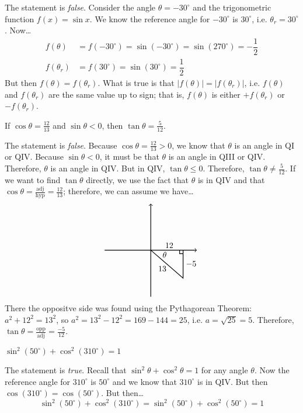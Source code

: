 \documentclass[11pt,letterpaper]{article}
\begin{document}
\sol The statement is \textit{false}. Consider the angle $\theta= -30^\circ$ and the trigonometric function $f(x)= \sin x$. We know the reference angle for $-30^\circ$ is $30^\circ$, i.e. $\theta_r= 30^\circ$. Now\dots
	\[
	\begin{aligned}
	f(\theta)&= f(-30^\circ)= \sin(-30^\circ)= \sin(270^\circ)= -\dfrac{1}{2} \\
	f(\theta_r)&= f(30^\circ)= \sin(30^\circ)= \dfrac{1}{2}
	\end{aligned}
	\]
But then $f(\theta)= f(\theta_r)$. What is true is that $|f(\theta)|= |f(\theta_r)|$, i.e. $f(\theta)$ and $f(\theta_r)$ are the same value up to sign; that is, $f(\theta)$ is either $+f(\theta_r)$ or $-f(\theta_r)$. \pvspace{1.3cm}



 If $\cos \theta= \frac{12}{13}$ and $\sin \theta < 0$, then $\tan \theta= \frac{5}{12}$. \pspace

\sol The statement is \textit{false}. Because $\cos \theta= \frac{12}{13} > 0$, we know that $\theta$ is an angle in QI or QIV. Because $\sin \theta < 0$, it must be that $\theta$ is an angle in QIII or QIV. Therefore, $\theta$ is an angle in QIV. But in QIV, $\tan \theta \leq 0$. Therefore, $\tan \theta \neq \frac{5}{12}$. If we want to find $\tan \theta$ directly, we use the fact that $\theta$ is in QIV and that $\cos \theta= \frac{\text{adj}}{\text{hyp}}= \frac{12}{13}$; therefore, we can assume we have\dots
	\[
	\begin{tikzpicture}
	\draw[line width=0.03cm,->] (-2,0) -- (2,0);				%
	\draw[line width=0.03cm,->] (0,-2) -- (0,2);				%
	
	\node at (0.6,-0.2) {$\theta$};
	\draw[line width=0.03cm] (0,0) -- (1.4,-1.2) -- (1.4,0);			%
	\draw[line width=0.03cm] (1.25,0) -- (1.25,-0.15) -- (1.4,-0.15);	%
	
	\node at (0.8,0.2) {$12$};
	\node at (1.75,-0.6) {$-5$};
	\node at (0.5,-0.8) {$13$};
	\end{tikzpicture}
	\]
There the oppositve side was found using the Pythagorean Theorem: $a^2 + 12^2= 13^2$, so $a^2= 13^2 - 12^2= 169 - 144= 25$, i.e. $a= \sqrt{25}= 5$. Therefore, $\tan \theta= \frac{\text{opp}}{\text{adj}}= \frac{-5}{12}$. \pvspace{1.3cm}



 $\sin^2(50^\circ) + \cos^2(310^\circ)= 1$ \pspace

\sol The statement is \textit{true}. Recall that $\sin^2 \theta + \cos^2 \theta= 1$ for any angle $\theta$. Now the reference angle for $310^\circ$ is $50^\circ$ and we know that $310^\circ$ is in QIV. But then $\cos(310^\circ)= \cos(50^\circ)$. But then\dots
	\[
	\sin^2(50^\circ) + \cos^2(310^\circ)= \sin^2(50^\circ) + \cos^2(50^\circ)= 1
	\] \pvspace{1.3cm}
\end{document}
